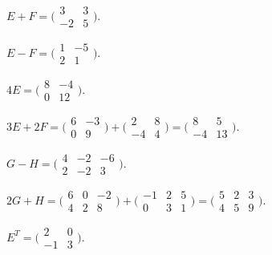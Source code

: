 \begin{solutions}
  \item $E + F = \bigl(\begin{smallmatrix} 3 & 3 \\ -2 & 5 \end{smallmatrix}\bigr)$.

  \item $E - F = \bigl(\begin{smallmatrix} 1 & -5 \\ 2 & 1 \end{smallmatrix}\bigr)$.

  \item $4 E = \bigl(\begin{smallmatrix} 8 & -4 \\ 0 & 12 \end{smallmatrix}\bigr)$.

  \item $3 E + 2 F = \bigl(\begin{smallmatrix} 6 & -3 \\ 0 & 9 \end{smallmatrix}\bigr) + \bigl(\begin{smallmatrix} 2 & 8 \\ -4 & 4 \end{smallmatrix}\bigr) = \bigl(\begin{smallmatrix} 8 & 5 \\ -4 & 13 \end{smallmatrix}\bigr)$.

  \item $G - H = \bigl(\begin{smallmatrix} 4 & -2 & -6 \\ 2 & -2 & 3 \end{smallmatrix}\bigr)$.

  \item $2 G + H = \bigl(\begin{smallmatrix} 6 & 0 & -2 \\ 4 & 2 & 8 \end{smallmatrix}\bigr) + \bigl(\begin{smallmatrix} -1 & 2 & 5 \\ 0 & 3 & 1 \end{smallmatrix}\bigr) = \bigl(\begin{smallmatrix} 5 & 2 & 3 \\ 4 & 5 & 9 \end{smallmatrix}\bigr)$.

  \item $E^{T} = \bigl(\begin{smallmatrix} 2 & 0 \\ -1 & 3 \end{smallmatrix}\bigr)$.


\end{solutions}
